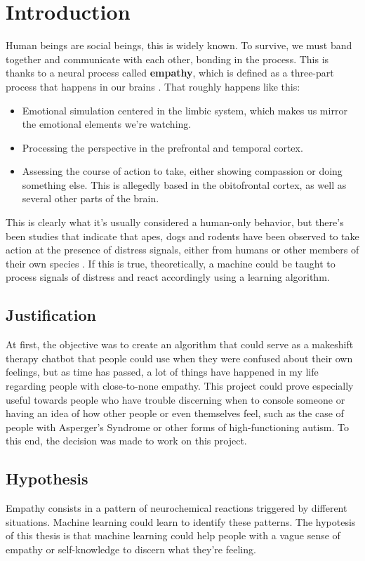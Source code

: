 \chapter{Introduction}
Human beings are social beings, this is widely known. To survive, we must band together and communicate with each other, bonding in the process. This is thanks to a neural process called \textbf{empathy}, which is defined as a three-part process that happens in our brains \citep{rf1}. That roughly happens like this:
\begin{itemize}
	\item Emotional simulation centered in the limbic system, which makes us mirror the emotional elements we're watching.
	\item Processing the perspective in the prefrontal and temporal cortex.
	\item Assessing the course of action to take, either showing compassion or doing something else. This is allegedly based in the obitofrontal cortex, as well as several other parts of the brain.
\end{itemize}
This is clearly what it's usually considered a human-only behavior, but there's been studies that indicate that apes, dogs and rodents have been observed to take action at the presence of distress signals, either from humans or other members of their own species \citep{rf2}.
If this is true, theoretically, a machine could be taught to process signals of distress and react accordingly using a learning algorithm.

\section{Justification}
At first, the objective was to create an algorithm that could serve as a makeshift therapy chatbot that people could use when they were confused about their own feelings, but as time has passed, a lot of things have happened in my life regarding people with close-to-none empathy.
This project could prove especially useful towards people who have trouble discerning when to console someone or having an idea of how other people or even themselves feel, such as the case of people with Asperger's Syndrome or other forms of high-functioning autism.
To this end, the decision was made to work on this project.

\section{Hypothesis}
Empathy consists in a pattern of neurochemical reactions triggered by different situations. Machine learning could learn to identify these patterns. The hypotesis of this thesis is that machine learning could help people with a vague sense of empathy or self-knowledge to discern what they're feeling.

